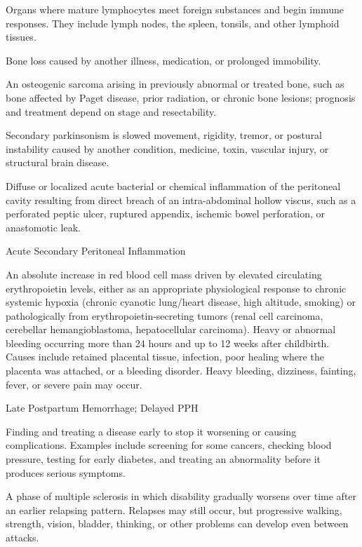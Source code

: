  Organs where mature lymphocytes meet foreign substances and begin immune responses. They include lymph nodes, the spleen, tonsils, and other lymphoid tissues.

 Bone loss caused by another illness, medication, or prolonged immobility.

 An osteogenic sarcoma arising in previously abnormal or treated bone, such as bone affected by Paget disease, prior radiation, or chronic bone lesions; prognosis and treatment depend on stage and resectability.

 Secondary parkinsonism is slowed movement, rigidity, tremor, or postural instability caused by another condition, medicine, toxin, vascular injury, or structural brain disease.

 Diffuse or localized acute bacterial or chemical inflammation of the peritoneal cavity resulting from direct breach of an intra-abdominal hollow viscus, such as a perforated peptic ulcer, ruptured appendix, ischemic bowel perforation, or anastomotic leak.

\synonyms
Acute Secondary Peritoneal Inflammation

 An absolute increase in red blood cell mass driven by elevated circulating erythropoietin levels, either as an appropriate physiological response to chronic systemic hypoxia (chronic cyanotic lung/heart disease, high altitude, smoking) or pathologically from erythropoietin-secreting tumors (renal cell carcinoma, cerebellar hemangioblastoma, hepatocellular carcinoma).
 Heavy or abnormal bleeding occurring more than 24 hours and up to 12 weeks after childbirth. Causes include retained placental tissue, infection, poor healing where the placenta was attached, or a bleeding disorder. Heavy bleeding, dizziness, fainting, fever, or severe pain may occur.

\synonyms
Late Postpartum Hemorrhage; Delayed PPH

 Finding and treating a disease early to stop it worsening or causing complications. Examples include screening for some cancers, checking blood pressure, testing for early diabetes, and treating an abnormality before it produces serious symptoms.

 A phase of multiple sclerosis in which disability gradually worsens over time after an earlier relapsing pattern. Relapses may still occur, but progressive walking, strength, vision, bladder, thinking, or other problems can develop even between attacks.

